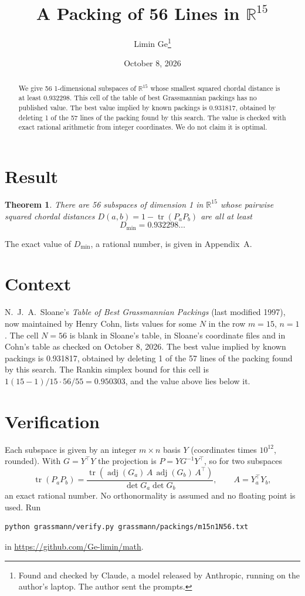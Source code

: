 \documentclass[11pt,a4paper]{article}
\title{A Packing of 56 Lines in $\mathbb{R}^{15}$}
\author{Limin Ge\thanks{Found and checked by Claude, a model released by Anthropic, running on the author's laptop. The author sent the prompts.}}
\date{October 8, 2026}
\newtheorem*{theorem}{Theorem}
\begin{document}
\maketitle
\begin{abstract}
We give 56 1-dimensional subspaces of $\mathbb{R}^{15}$ whose smallest squared chordal distance is at least 0.932298. This cell of the table of best Grassmannian packings has no published value. The best value implied by known packings is 0.931817, obtained by deleting 1 of the 57 lines of the packing found by this search. The value is checked with exact rational arithmetic from integer coordinates. We do not claim it is optimal.
\end{abstract}

\section{Result}
\begin{theorem}
There are 56 subspaces of dimension 1 in $\mathbb{R}^{15}$ whose pairwise squared chordal distances $D(a,b) = 1 - \operatorname{tr}(P_aP_b)$ are all at least
\[ D_{\min} = 0.932298\ldots \]
\end{theorem}
The exact value of $D_{\min}$, a rational number, is given in Appendix~A.


\section{Context}
N.~J.~A.~Sloane's \emph{Table of Best Grassmannian Packings} (last modified 1997), now maintained by Henry Cohn, lists values for some $N$ in the row $m=15$, $n=1$. The cell $N=56$ is blank in Sloane's table, in Sloane's coordinate files and in Cohn's table as checked on October 8, 2026. The best value implied by known packings is 0.931817, obtained by deleting 1 of the 57 lines of the packing found by this search. The Rankin simplex bound for this cell is $1(15-1)/15\cdot 56/55 = 0.950303$, and the value above lies below it.


\section{Verification}
Each subspace is given by an integer $m\times n$ basis $Y$ (coordinates times $10^{12}$, rounded). With $G=Y^\top Y$ the projection is $P=YG^{-1}Y^\top$, so for two subspaces
\[ \operatorname{tr}(P_aP_b)=\frac{\operatorname{tr}(\operatorname{adj}(G_a)\,A\,\operatorname{adj}(G_b)\,A^\top)}{\det G_a\det G_b},\qquad A=Y_a^\top Y_b, \]
an exact rational number. No orthonormality is assumed and no floating point is used. Run
\begin{verbatim}
python grassmann/verify.py grassmann/packings/m15n1N56.txt
\end{verbatim}
in \url{https://github.com/Ge-limin/math}.
\end{document}
